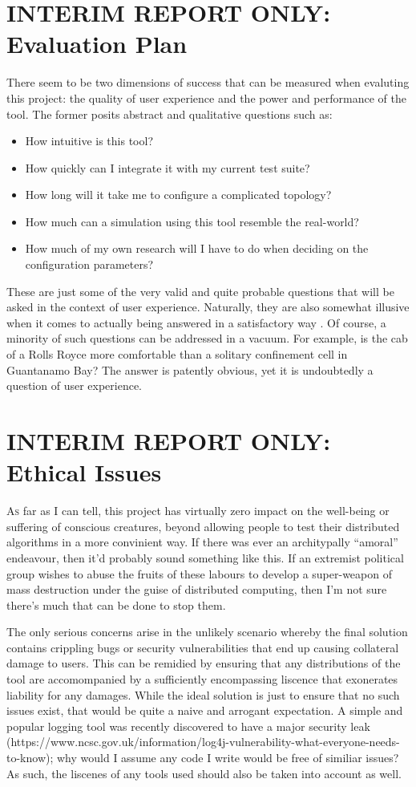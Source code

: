 \section{INTERIM REPORT ONLY: Evaluation Plan}

There seem to be two dimensions of success that can be measured when evaluting this project: the quality of user
experience and the power and performance of the tool. The former posits abstract and qualitative questions such as:
\begin{itemize}
    \item How intuitive is this tool?
    \item How quickly can I integrate it with my current test suite?
    \item How long will it take me to configure a complicated topology?
    \item How much can a simulation using this tool resemble the real-world?
    \item How much of my own research will I have to do when deciding on the configuration parameters?
\end{itemize}

These are just some of the very valid and quite probable questions that will be asked in the context of user
experience. Naturally, they are also somewhat illusive when it comes to actually being answered in a satisfactory way
. Of course, a minority of such questions can be addressed in a vacuum. For example, is the cab of a Rolls Royce more
comfortable than a solitary confinement cell in Guantanamo Bay? The answer is patently obvious, yet it is undoubtedly
a question of user experience. 


\section{INTERIM REPORT ONLY: Ethical Issues}

\lettrine{A}{s} far as I can tell, this project has virtually zero impact on the well-being or suffering of conscious
creatures, beyond allowing people to test their distributed algorithms in a more convinient way. If there was ever an
architypally ``amoral'' endeavour, then it'd probably sound something like this. If an extremist political group
wishes to abuse the fruits of these labours to develop a super-weapon of mass destruction under the guise of
distributed computing, then I'm not sure there's much that can be done to stop them.

The only serious concerns arise in the unlikely scenario whereby the final solution contains crippling bugs or security
vulnerabilities that end up causing collateral damage to users. This can be remidied by ensuring that any
distributions of the tool are accomompanied by a sufficiently encompassing liscence that exonerates liability for any
damages. While the ideal solution is just to ensure that no such issues exist, that would be quite a naive and
arrogant expectation. A simple and popular logging tool was recently discovered to have a major security leak
(https://www.ncsc.gov.uk/information/log4j-vulnerability-what-everyone-needs-to-know); why would I assume any code I
write would be free of similiar issues? As such, the liscenes of any tools used should also be taken into account as
well.
